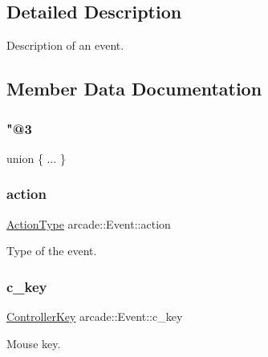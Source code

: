 \subsection{Detailed Description}
Description of an event. 

\subsection{Member Data Documentation}
\mbox{\label{structarcade_1_1_event_af7239e1001b65e42e8943daebf9188a2}} 
\subsubsection{\texorpdfstring{"@3}{@3}}
{\footnotesize\ttfamily union \{ ... \} }

\mbox{\label{structarcade_1_1_event_a4c0d22bb440a9185fe94b9a66759823c}} 
\subsubsection{\texorpdfstring{action}{action}}
{\footnotesize\ttfamily \hyperlink{namespacearcade_a1b6c05b243c7e94d71fb328705e619bd}{Action\+Type} arcade\+::\+Event\+::action}



Type of the event. 

\mbox{\label{structarcade_1_1_event_a9d837c85701594ddda4d04dc5b1d8a39}} 
\subsubsection{\texorpdfstring{c\+\_\+key}{c\_key}}
{\footnotesize\ttfamily \hyperlink{namespacearcade_a4281850c2b4199c96efad8ba85f8aa21}{Controller\+Key} arcade\+::\+Event\+::c\+\_\+key}



Mouse key. 

\mbox{\label{structarcade_1_1_event_aa6cca034ec9c2c6b3d9078e8a0ce8700}} 
